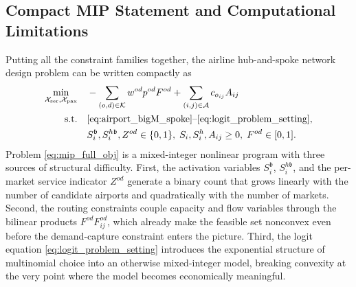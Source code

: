 \subsection{Compact MIP Statement and Computational Limitations}
\label{sec:mip_compact_statement}
Putting all the constraint families together, the airline hub-and-spoke network design problem can be written compactly as
\begin{align}
\min_{\mathcal{X}_{\mathrm{ser}},\mathcal{X}_{\mathrm{pax}}}
\quad &
-\sum_{(o,d)\in\mathcal{K}} w^{od}p^{od}F^{od}
+\sum_{(i,j)\in\mathcal{A}} c_{o_{ij}}A_{ij}
\label{eq:mip_full_obj}\\
\text{s.t.}\quad &
\eqref{eq:airport_bigM_spoke}\text{--}\eqref{eq:logit_problem_setting},
\nonumber\\
& S_i^{\mathfrak b},S_i^{h\mathfrak b},Z^{od}\in\{0,1\},\;
S_i,S_i^h,A_{ij}\ge 0,\;
F^{od}\in[0,1].
\nonumber
\end{align}
Problem \eqref{eq:mip_full_obj} is a mixed-integer nonlinear program with three sources of structural difficulty. First, the activation variables $S_i^{\mathfrak b}$, $S_i^{h\mathfrak b}$, and the per-market service indicator $Z^{od}$ generate a binary count that grows linearly with the number of candidate airports and quadratically with the number of markets. Second, the routing constraints couple capacity and flow variables through the bilinear products $F^{od}F_{ij}^{od}$, which already make the feasible set nonconvex even before the demand-capture constraint enters the picture. Third, the logit equation \eqref{eq:logit_problem_setting} introduces the exponential structure of multinomial choice into an otherwise mixed-integer model, breaking convexity at the very point where the model becomes economically meaningful.

